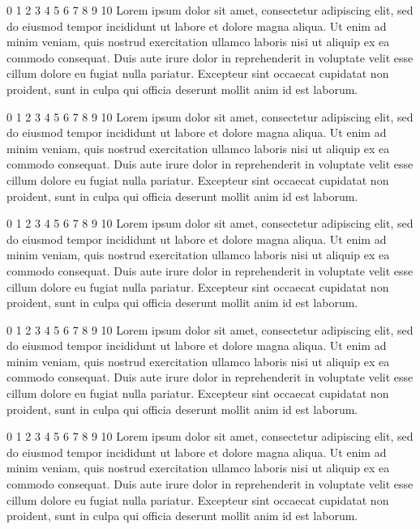 0 1 2 3 4 5 6 7 8 9 10
Lorem ipsum dolor sit amet, consectetur adipiscing elit, sed do eiusmod tempor incididunt ut labore et dolore magna aliqua. Ut enim ad minim veniam, quis nostrud exercitation ullamco laboris nisi ut aliquip ex ea commodo consequat. Duis aute irure dolor in reprehenderit in voluptate velit esse cillum dolore eu fugiat nulla pariatur. Excepteur sint occaecat cupidatat non proident, sunt in culpa qui officia deserunt mollit anim id est laborum.

0 1 2 3 4 5 6 7 8 9 10
Lorem ipsum dolor sit amet, consectetur adipiscing elit, sed do eiusmod tempor incididunt ut labore et dolore magna aliqua. Ut enim ad minim veniam, quis nostrud exercitation ullamco laboris nisi ut aliquip ex ea commodo consequat. Duis aute irure dolor in reprehenderit in voluptate velit esse cillum dolore eu fugiat nulla pariatur. Excepteur sint occaecat cupidatat non proident, sunt in culpa qui officia deserunt mollit anim id est laborum.

0 1 2 3 4 5 6 7 8 9 10
Lorem ipsum dolor sit amet, consectetur adipiscing elit, sed do eiusmod tempor incididunt ut labore et dolore magna aliqua. Ut enim ad minim veniam, quis nostrud exercitation ullamco laboris nisi ut aliquip ex ea commodo consequat. Duis aute irure dolor in reprehenderit in voluptate velit esse cillum dolore eu fugiat nulla pariatur. Excepteur sint occaecat cupidatat non proident, sunt in culpa qui officia deserunt mollit anim id est laborum.

0 1 2 3 4 5 6 7 8 9 10
Lorem ipsum dolor sit amet, consectetur adipiscing elit, sed do eiusmod tempor incididunt ut labore et dolore magna aliqua. Ut enim ad minim veniam, quis nostrud exercitation ullamco laboris nisi ut aliquip ex ea commodo consequat. Duis aute irure dolor in reprehenderit in voluptate velit esse cillum dolore eu fugiat nulla pariatur. Excepteur sint occaecat cupidatat non proident, sunt in culpa qui officia deserunt mollit anim id est laborum.

0 1 2 3 4 5 6 7 8 9 10
Lorem ipsum dolor sit amet, consectetur adipiscing elit, sed do eiusmod tempor incididunt ut labore et dolore magna aliqua. Ut enim ad minim veniam, quis nostrud exercitation ullamco laboris nisi ut aliquip ex ea commodo consequat. Duis aute irure dolor in reprehenderit in voluptate velit esse cillum dolore eu fugiat nulla pariatur. Excepteur sint occaecat cupidatat non proident, sunt in culpa qui officia deserunt mollit anim id est laborum.
